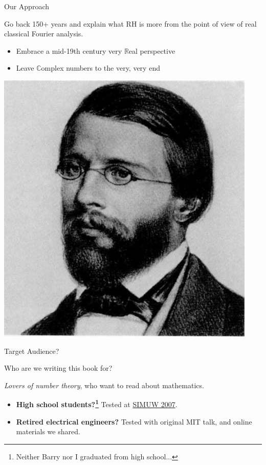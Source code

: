 \documentclass{beamer}
\begin{document}
\begin{frame}{Our Approach}
  \begin{block}{}
    Go back 150+ years and explain what RH is more from the point of view of real classical Fourier analysis.
    \begin{itemize}
      \item Embrace a mid-19th century very $\mathbb{R}$eal perspective
      \item Leave $\mathbb{C}$omplex numbers to the very, very end
    \end{itemize}
  \end{block}
  \begin{center}
    \includegraphics[height=.5\textheight]{pics/riemann}
  \end{center}

\end{frame}


\begin{frame}{Target Audience?}

  \begin{block}{Who are we writing this book for?}
    \vspace{.25in}

    {\em Lovers of number theory}, who want to read about mathematics.
    \vspace{.25in}

    \begin{itemize}
      \item \textbf{High school students?\footnote{Neither Barry nor I  graduated from high school...}} Tested at \href{https://wstein.org/edu/2007/simuw07/}{SIMUW 2007}.
      \item \textbf{Retired electrical engineers?}  Tested with original MIT talk, and  online materials we shared.
    \end{itemize}
    \vspace{.5in}

  \end{block}

\end{frame}
\end{document}
